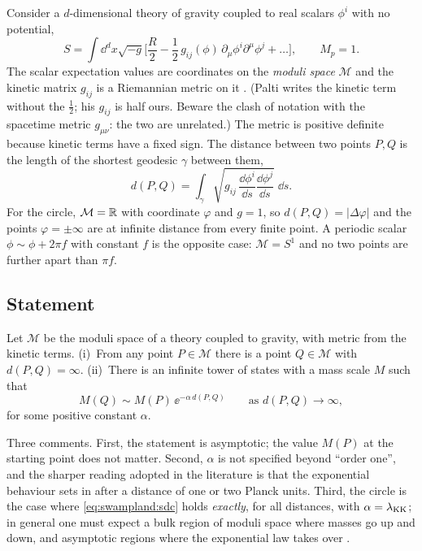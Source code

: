 Consider a $d$-dimensional theory of gravity coupled to real scalars $\phi^i$ with no potential,
\begin{equation}\label{eq:swampland:sigma}
S=\int\dd^dx\sqrt{-g}\Big[\frac{R}{2}-\frac12\,g_{ij}(\phi)\,\partial_\mu\phi^i\partial^\mu\phi^j+\dots\Big],
\qquad M_p=1 .
\end{equation}
The scalar expectation values are coordinates on the \emph{moduli space} $\mathcal M$ and the
kinetic matrix $g_{ij}$ is a Riemannian metric on it . (Palti
writes the kinetic term without the $\tfrac12$; his $g_{ij}$ is half ours. Beware the clash of
notation with the spacetime metric $g_{\mu\nu}$: the two are unrelated.) The metric is positive
definite because kinetic terms have a fixed sign. The distance between two points $P,Q$ is the
length of the shortest geodesic $\gamma$ between them,
\begin{equation}\label{eq:swampland:dist}
d(P,Q)=\int_\gamma\sqrt{g_{ij}\,\frac{\dd\phi^i}{\dd s}\frac{\dd\phi^j}{\dd s}}\;\dd s .
\end{equation}
For the circle, $\mathcal M=\mathbb{R}$ with coordinate $\varphi$ and $g=1$, so $d(P,Q)=|\Delta\varphi|$ and
the points $\varphi=\pm\infty$ are at infinite distance from every finite point. A periodic scalar
$\phi\sim\phi+2\pi f$ with constant $f$ is the opposite case: $\mathcal M=S^1$ and no two points are
further apart than $\pi f$.

\subsection{Statement}

\begin{conjecture}\label{conj:swampland:sdc}
Let $\mathcal M$ be the moduli space of a theory coupled to gravity, with metric from the kinetic
terms. (i)~From any point $P\in\mathcal M$ there is a point $Q\in\mathcal M$ with $d(P,Q)=\infty$.
(ii)~There is an infinite tower of states with a mass scale $M$ such that
\begin{equation}\label{eq:swampland:sdc}
M(Q)\sim M(P)\,\ee^{-\alpha\,d(P,Q)}\qquad\text{as }d(P,Q)\to\infty,
\end{equation}
for some positive constant $\alpha$. 
\end{conjecture}

Three comments. First, the statement is asymptotic; the value $M(P)$ at the starting point does not
matter. Second, $\alpha$ is not specified beyond ``order one'', and the sharper reading adopted in
the literature is that the exponential behaviour sets in after a distance of one or two Planck
units. Third, the circle is the case where \eqref{eq:swampland:sdc} holds \emph{exactly}, for all
distances, with $\alpha=\lambda_{\rm KK}$; in general one must expect a bulk region of moduli space
where masses go up and down, and asymptotic regions where the exponential law takes over
.

